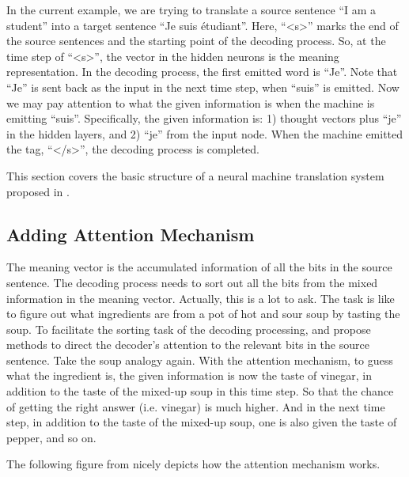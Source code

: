 \documentclass[final]{ua-thesis}
\numberwithin{equation}{section}
\begin{document}
In the current example, we are trying to translate a source sentence ``I am a student'' into a target sentence ``Je suis \'{e}tudiant''. Here, ``<s>'' marks the end of the source sentences and the starting point of the decoding process. 
So, at the time step of  ``<s>'', the vector in the hidden neurons is the meaning representation. In the decoding process, the first emitted word is ``Je''. Note that ``Je'' is sent back as the input in the next time step, when ``suis'' is emitted. Now we may pay attention to what the given information is when the machine is emitting ``suis''. Specifically, the given information is: 1) thought vectors plus ``je'' in the hidden layers, and 2) ``je'' from the input node. When the machine emitted the tag, ``</s>'', the decoding process is completed. 

This section covers the basic structure of a neural machine translation system proposed in \citet{cho2014properties, cho2014learning}.  


\subsection{Adding Attention Mechanism}

The meaning vector is the accumulated information of all the bits in the source sentence. The decoding process needs to sort out all the bits from the mixed information in the meaning vector. Actually, this is a lot to ask. The task is like to figure out what ingredients are from a pot of hot and sour soup by tasting the soup. To facilitate the sorting task of the decoding processing, \citet{bahdanau2014neural} and \citet{luong2015effective} propose methods to direct the decoder's attention to the relevant bits in the source sentence. Take the soup analogy again. With the attention mechanism, to guess what the ingredient is, the given information is now the taste of vinegar, in addition to the taste of the mixed-up soup in this time step. So that the chance of getting the right answer (i.e. vinegar) is much higher. And in the next time step, in addition to the taste of the mixed-up soup, one is also given the taste of pepper, and so on.   

The following figure from \citet{luong17GitHub} nicely depicts how the attention mechanism works. 
\end{document}
